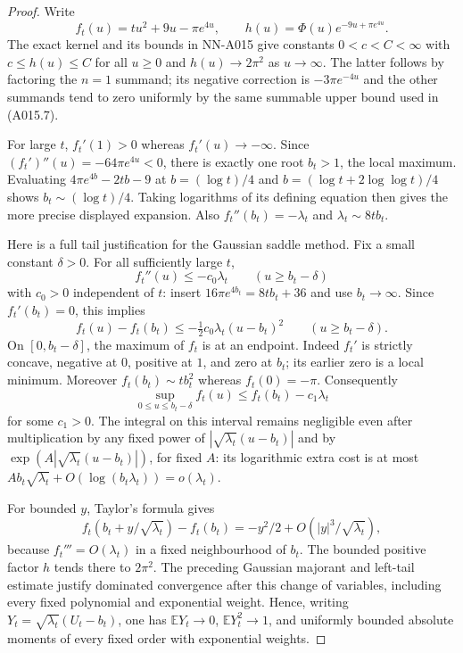 \begin{proof}
Write
\[
 f_t(u)=tu^2+9u-\pi e^{4u},\qquad
 h(u)=\Phi(u)e^{-9u+\pi e^{4u}}.
\]
The exact kernel and its bounds in NN-A015 give constants
$0<c<C<\infty$ with $c\le h(u)\le C$ for all $u\ge0$ and
$h(u)\to2\pi^2$ as $u\to\infty$. The latter follows by factoring
the $n=1$ summand; its negative correction is
$-3\pi e^{-4u}$ and the other summands tend to zero uniformly by
the same summable upper bound used in (A015.7).

For large $t$, $f_t'(1)>0$ whereas $f_t'(u)\to-\infty$.
Since $(f_t')''(u)=-64\pi e^{4u}<0$, there is exactly one root
$b_t>1$, the local maximum. Evaluating $4\pi e^{4b}-2tb-9$ at
$b=(\log t)/4$ and $b=(\log t+2\log\log t)/4$ shows
$b_t\sim(\log t)/4$. Taking logarithms of its defining equation
then gives the more precise displayed expansion. Also
$f_t''(b_t)=-\lambda_t$ and $\lambda_t\sim8tb_t$.

Here is a full tail justification for the Gaussian saddle method.
Fix a small constant $\delta>0$. For all sufficiently large $t$,
\[
 f_t''(u)\le-c_0\lambda_t\qquad (u\ge b_t-\delta)
\]
with $c_0>0$ independent of $t$: insert
$16\pi e^{4b_t}=8tb_t+36$ and use $b_t\to\infty$.
Since $f_t'(b_t)=0$, this implies
\[
 f_t(u)-f_t(b_t)\le-\tfrac12c_0\lambda_t(u-b_t)^2
               \qquad(u\ge b_t-\delta).
\]
On $[0,b_t-\delta]$, the maximum of $f_t$ is at an endpoint.
Indeed $f_t'$ is strictly concave, negative at $0$, positive at $1$,
and zero at $b_t$; its earlier zero is a local minimum.
Moreover $f_t(b_t)\sim tb_t^2$ whereas $f_t(0)=-\pi$.
Consequently
\[
 \sup_{0\le u\le b_t-\delta}f_t(u)
                       \le f_t(b_t)-c_1\lambda_t
\]
for some $c_1>0$. The integral on this interval remains negligible
even after multiplication by any fixed power of
$|\sqrt{\lambda_t}(u-b_t)|$ and by
$\exp(A|\sqrt{\lambda_t}(u-b_t)|)$, for fixed $A$:
its logarithmic extra cost is at most
$A b_t\sqrt{\lambda_t}+O(\log(b_t\lambda_t))=o(\lambda_t)$.

For bounded $y$, Taylor's formula gives
\[
 f_t(b_t+y/\sqrt{\lambda_t})-f_t(b_t)
                  =-y^2/2+O(|y|^3/\sqrt{\lambda_t}),
\]
because $f_t'''=O(\lambda_t)$ in a fixed neighbourhood of $b_t$.
The bounded positive factor $h$ tends there to $2\pi^2$.
The preceding Gaussian majorant and left-tail estimate justify
dominated convergence after this change of variables, including
every fixed polynomial and exponential weight. Hence, writing
$Y_t=\sqrt{\lambda_t}(U_t-b_t)$, one has
$\mathbb E Y_t\to0$, $\mathbb E Y_t^2\to1$, and uniformly bounded
absolute moments of every fixed order with exponential weights.


\end{proof}
